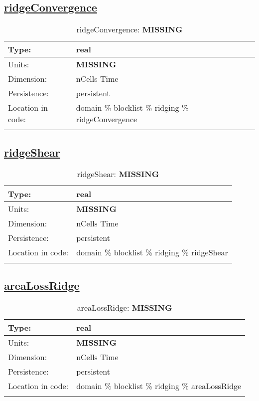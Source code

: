 \subsection[ridgeConvergence]{\hyperref[sec:var_tab_ridging]{ridgeConvergence}}
\label{subsec:var_sec_ridging_ridgeConvergence}
\begin{center}
\begin{longtable}{| p{2.0in} | p{4.0in} |}
        \hline 
        Type: & real \\
        \hline 
        Units: & {\bf \color{red} MISSING} \\
        \hline 
        Dimension: & nCells Time \\
        \hline 
        Persistence: & persistent \\
        \hline 
         Location in code: & domain \% blocklist \% ridging \% ridgeConvergence \\
         \hline 
    \caption{ridgeConvergence: {\bf \color{red} MISSING}}
\end{longtable}
\end{center}
\subsection[ridgeShear]{\hyperref[sec:var_tab_ridging]{ridgeShear}}
\label{subsec:var_sec_ridging_ridgeShear}
\begin{center}
\begin{longtable}{| p{2.0in} | p{4.0in} |}
        \hline 
        Type: & real \\
        \hline 
        Units: & {\bf \color{red} MISSING} \\
        \hline 
        Dimension: & nCells Time \\
        \hline 
        Persistence: & persistent \\
        \hline 
         Location in code: & domain \% blocklist \% ridging \% ridgeShear \\
         \hline 
    \caption{ridgeShear: {\bf \color{red} MISSING}}
\end{longtable}
\end{center}
\subsection[areaLossRidge]{\hyperref[sec:var_tab_ridging]{areaLossRidge}}
\label{subsec:var_sec_ridging_areaLossRidge}
\begin{center}
\begin{longtable}{| p{2.0in} | p{4.0in} |}
        \hline 
        Type: & real \\
        \hline 
        Units: & {\bf \color{red} MISSING} \\
        \hline 
        Dimension: & nCells Time \\
        \hline 
        Persistence: & persistent \\
        \hline 
         Location in code: & domain \% blocklist \% ridging \% areaLossRidge \\
         \hline 
    \caption{areaLossRidge: {\bf \color{red} MISSING}}
\end{longtable}
\end{center}
